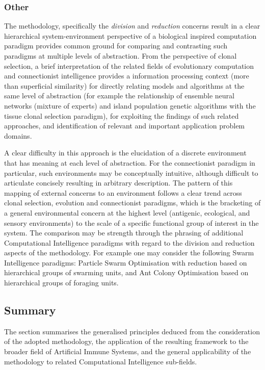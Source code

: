%
%
\subsubsection{Other}
The methodology, specifically the \emph{division} and \emph{reduction} concerns result in a clear hierarchical system-environment perspective of a biological inspired computation paradigm provides common ground for comparing and contrasting such paradigms at multiple levels of abstraction. From the perspective of clonal selection, a brief interpretation of the related fields of evolutionary computation and connectionist intelligence provides a information processing context (more than superficial similarity) for directly relating models and algorithms at the same level of abstraction (for example the relationship of ensemble neural networks (mixture of experts) and island population genetic algorithms with the tissue clonal selection paradigm), for exploiting the findings of such related approaches, and identification of relevant and important application problem domains. 

A clear difficulty in this approach is the elucidation of a discrete environment that has meaning at each level of abstraction. For the connectionist paradigm in particular, such environments may be conceptually intuitive, although difficult to articulate concisely resulting in arbitrary description. The pattern of this mapping of external concerns to an environment follows a clear trend across clonal selection, evolution and connectionist paradigms, which is the bracketing of a general environmental concern at the highest level (antigenic, ecological, and sensory environments) to the scale of a specific functional group of interest in the system.
The comparison may be strength through the phrasing of additional Computational Intelligence paradigms with regard to the division and reduction aspects of the methodology. For example one may consider the following Swarm Intelligence paradigms: Particle Swarm Optimisation with reduction based on hierarchical groups of swarming units, and Ant Colony Optimisation based on hierarchical groups of foraging units.

%
%
\subsection{Summary}
The section summarises the generalised principles deduced from the consideration of the adopted methodology, the application of the resulting framework to the broader field of Artificial Immune Systems, and the general applicability of the methodology to related Computational Intelligence sub-fields.

